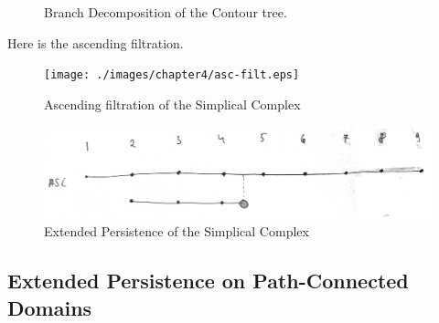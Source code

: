 \begin{figure}[h]
    \qquad
    \caption{Branch Decomposition of the Contour tree.}%
    \label{fig:example}%
\end{figure}

Here is the ascending filtration.

\begin{figure}[h]%
    \centering
    \texttt{[image: ./images/chapter4/asc-filt.eps]}%
    \caption{Ascending filtration of the Simplical Complex}%
    \label{fig:filt-sc}%
\end{figure}

\begin{figure}[h]%
    \centering
    \includegraphics[scale=0.08]{./images/chapter4/ph.eps}%
    \caption{Extended Persistence of the Simplical Complex}%
    \label{fig:filt-sc}%
\end{figure}


\subsection{Extended Persistence on Path-Connected Domains}

